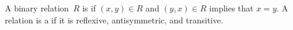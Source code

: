 \documentclass{test}  %
\begin{document}
\begin{problem}
\end{problem}

\begin{df}
A binary relation~$R$ is  if
$(x,y)\in R$ and $(y,x)\in R$ implies that $x=y$.
A relation is a  if it is 
reflexive, antisymmetric, and transitive.  
\end{df}
\end{document}
